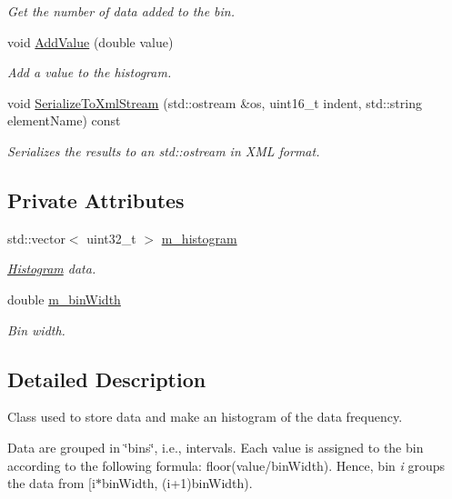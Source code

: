 \begin{DoxyCompactItemize}
\begin{DoxyCompactList}\small\item\em Get the number of data added to the bin. \end{DoxyCompactList}\item 
void \hyperlink{classns3_1_1Histogram_a918f0b67189617814abf42fd59e34de4}{Add\+Value} (double value)
\begin{DoxyCompactList}\small\item\em Add a value to the histogram. \end{DoxyCompactList}\item 
void \hyperlink{classns3_1_1Histogram_a343b3cbbe2f1e7d2066d236de1d1a0a2}{Serialize\+To\+Xml\+Stream} (std\+::ostream \&os, uint16\+\_\+t indent, std\+::string element\+Name) const 
\begin{DoxyCompactList}\small\item\em Serializes the results to an std\+::ostream in X\+ML format. \end{DoxyCompactList}\end{DoxyCompactItemize}
\subsection*{Private Attributes}
\begin{DoxyCompactItemize}
\item 
std\+::vector$<$ uint32\+\_\+t $>$ \hyperlink{classns3_1_1Histogram_a4e84e8b2f18d8dd6c23bc55ea8c18c4a}{m\+\_\+histogram}
\begin{DoxyCompactList}\small\item\em \hyperlink{classns3_1_1Histogram}{Histogram} data. \end{DoxyCompactList}\item 
double \hyperlink{classns3_1_1Histogram_a6c8752ed3fce033a0d5d96eb52944c6f}{m\+\_\+bin\+Width}
\begin{DoxyCompactList}\small\item\em Bin width. \end{DoxyCompactList}\end{DoxyCompactItemize}


\subsection{Detailed Description}
Class used to store data and make an histogram of the data frequency. 

Data are grouped in \char`\"{}bins\char`\"{}, i.\+e., intervals. Each value is assigned to the bin according to the following formula\+: floor(value/bin\+Width). Hence, bin {\itshape i} groups the data from \mbox{[}i$\ast$bin\+Width, (i+1)bin\+Width).

